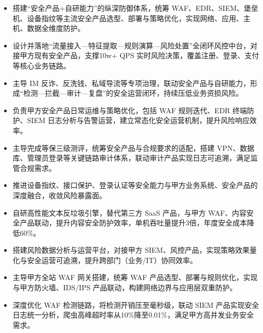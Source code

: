 
\begin{itemize}
    \item 搭建“安全产品+自研能力”的纵深防御体系，统筹 WAF、EDR、SIEM、堡垒机、设备指纹等主流安全产品选型、部署与策略优化，实现网络、应用、主机、数据全维度防护。
    \item 设计并落地“流量接入—特征提取—规则演算—风险处置”全闭环风控中台，对接甲方现有安全产品，支撑10w+ QPS 实时风险决策，覆盖注册、登录、支付等核心业务链路。
    \item 主导 IM 反诈、反洗钱、私域导流等专项治理，联动安全产品与自研能力，形成“检测—拦截—审计—复盘”的安全运营闭环，持续压低业务资损风险。
\end{itemize}

\begin{itemize}
    \item 负责甲方安全产品日常运维与策略优化，包括 WAF 规则迭代、EDR 终端防护、SIEM 日志分析与告警运营，建立常态化安全运营机制，提升风险响应效率。
    \item 主导完成等保三级测评，统筹安全产品与合规要求的适配，搭建 VPN、数据库、管理员登录等关键链路审计体系，联动审计产品实现日志可追溯，满足监管合规需求。
    \item 推进设备指纹、接口保护、登录认证等安全能力与甲方业务系统、安全产品的深度融合，收敛风险暴露面。
\end{itemize}

\begin{itemize}
    \item 自研高性能文本反垃圾引擎，替代第三方 SaaS 产品，与甲方 WAF、内容安全产品联动，提升内容安全防护效率，单机吞吐量提升3倍，年度安全成本降低60\%。
    \item 搭建风险数据分析与运营平台，对接甲方 SIEM、风控产品，实现策略效果量化与安全运营可追溯，提升跨部门（业务/IT）协同效率。
\end{itemize}

\vspace{0.10cm}


\begin{itemize}
    \item 主导甲方全站 WAF 网关搭建，统筹 WAF 产品选型、部署与规则优化，实现与甲方防火墙、IDS/IPS 产品联动，构建网络边界与应用层双重防护。
    \item 深度优化 WAF 检测链路，将检测开销压至毫秒级，联动 SIEM 产品实现安全日志统一分析，爬虫高峰超时率从10\%降至0.01\%，满足甲方高并发业务安全需求。
\end{itemize}

